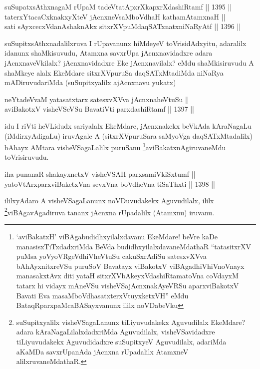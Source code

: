 \begin{shl}
suSupatxsAthxnagaM rUpaM tadeVtatApxrXkapxrXdashiRtamf \hfill || 1395 ||  \\
taterxYtacaCxknakxyXteV jAcnxneV\s saMboVdhaH kathamAtamxnaH || \\
sati sAyxcecxVdanAshaknAkx sitxrXVpuMdaqSATxnatxniNaRyAtf \hfill || 1396 ||  
\end{shl}

\begin{artha}
suSupitxsAthxnadalilxruva I rUpavanunx hiMdeyeV toVrisidAdxyitu, adaralilx idanunx shaMkisuvudu, Atamxna savxrUpa jAcnxnavidadxre adara jAcnxnaveVkilalx? jAcnxnavidadxre Eke jAcnxnavilalx? eMdu shaMkisiruvudu A shaMkeye alalx EkeMdare sitxrXVpuruSa daqSATxMtadiMda niNaRya mADiruvudariMda (suSupitxyalilx ajAcnxnavu yukatx)
\end{artha}


\begin{shl}
neYtadeVvaM yatasatxtarx satesxvXVva jAcnxnaheVtuSu || \\
aviBakotxV visheVSeVSu BavatiVti parxdashiRtamf \hfill || 1397 ||  
\end{shl}

\begin{artha}
idu I riVti heVLidudx sariyalalx EkeMdare, jAcnxnakekx beVkAda kAraNagaLu (iMdirxyAdigaLu) iruvAgale A (sitxrXVpuruSara saMyoVga daqSATxMtadalilx) bAhayx AMtara visheVSagaLalilx puruSanu \footnote[1]{`aviBakatxH' viBAgabudidhxyilalxdavanu EkeMdare! beVre kaDe manasisxTiTxdadxriMda BeVda budidhxyilalxdavaneMdathaR ``tatasitxrXV puMsa yoVyoVRgeVdhiVheVtuSu cakuSxrAdiSu satesxvXVva bAhAyxnitxreVSu puruSoV Bavatayx viBakotxV viBAgadhiVhiVnoV\s nayx manasakxtAvx diti yataH sitxrXVbAkeyxVdashiRtamatoVna coVdayxM tatarx hi vidayx mAneVSu visheVSajAcnxnakAyeVRSu aparxviBakotxV Bavati Eva masaMboVdhasatxterxVtuyxketxVH'' eMdu BataqRparxpaMcaBASayxvanunx ililx noVDabeVku}aviBakatxnAgiruvaneMdu toVrisiruvudu.
\end{artha}

\begin{shl}
iha punanaR shakayxnetxV visheVSAH parxsamiVkiSxtumf || \\
yatoV\s tArxparxviBaketxVna sevxVna boVdheVna tiSaThxti \hfill || 1398 ||  
\end{shl}

\begin{artha}
ililxyAdaro A visheVSagaLanunx noVDuvudakekx Aguvudilalx, ililx \footnote[2]{suSupitxyalilx visheVSagaLanunx tiLiyuvudakekx Aguvudilalx EkeMdare? adara kAraNagaLilalxdadxriMda Aguvudilalx, visheVSavidadxre tiLiyuvudakekx Aguvudidadxre suSupitxyeV Aguvudilalx, adariMda aKaMDa savxrUpanAda jAcnxna rUpadalilx AtamxneV alilxruvaneMdathaR.}viBAgavAgadiruva tananx jAcnxna rUpadalilx (Atamxnu) iruvanu.
\end{artha}

